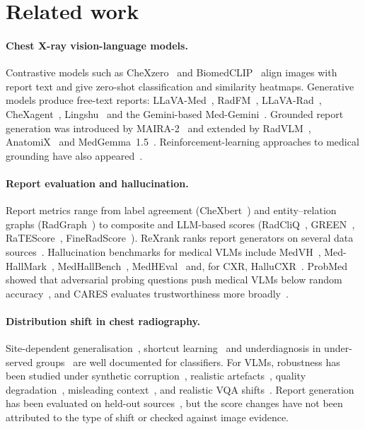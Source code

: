 \documentclass[pdflatex,sn-mathphys-num]{sn-jnl}
\theoremstyle{thmstyleone}
\begin{document}
\section{Related work}\label{sec:related}

\paragraph{Chest X-ray vision-language models.} Contrastive models such as CheXzero~\cite{chexzero} and BiomedCLIP~\cite{biomedclip} align images with report text and give zero-shot classification and similarity heatmaps. Generative models produce free-text reports: LLaVA-Med~\cite{llavamed}, RadFM~\cite{radfm}, LLaVA-Rad~\cite{llavarad}, CheXagent~\cite{chexagent}, Lingshu~\cite{lingshu} and the Gemini-based Med-Gemini~\cite{medgemini}. Grounded report generation was introduced by MAIRA-2~\cite{maira2} and extended by RadVLM~\cite{radvlm}, AnatomiX~\cite{anatomix} and MedGemma~1.5~\cite{medgemma15}. Reinforcement-learning approaches to medical grounding have also appeared~\cite{medrpg_r1}.

\paragraph{Report evaluation and hallucination.} Report metrics range from label agreement (CheXbert~\cite{chexbert}) and entity--relation graphs (RadGraph~\cite{radgraph}) to composite and LLM-based scores (RadCliQ~\cite{radcliq}, GREEN~\cite{green}, RaTEScore~\cite{ratescore}, FineRadScore~\cite{fineradscore}). ReXrank ranks report generators on several data sources~\cite{rexrank}. Hallucination benchmarks for medical VLMs include MedVH~\cite{medvh}, Med-HallMark~\cite{medhallmark}, MedHallBench~\cite{medhallbench}, MedHEval~\cite{medheval} and, for CXR, HalluCXR~\cite{hallucxr}. ProbMed showed that adversarial probing questions push medical VLMs below random accuracy~\cite{probmed}, and CARES evaluates trustworthiness more broadly~\cite{cares}.

\paragraph{Distribution shift in chest radiography.} Site-dependent generalisation~\cite{zech}, shortcut learning~\cite{degrave} and underdiagnosis in under-served groups~\cite{underdiag} are well documented for classifiers. For VLMs, robustness has been studied under synthetic corruption~\cite{medmnistc,medimetac}, realistic artefacts~\cite{artefacts}, quality degradation~\cite{medqdeg,lrrg}, misleading context~\cite{mccxr}, and realistic VQA shifts~\cite{surevqa}. Report generation has been evaluated on held-out sources~\cite{hoppr,rexrank}, but the score changes have not been attributed to the type of shift or checked against image evidence.
\end{document}
